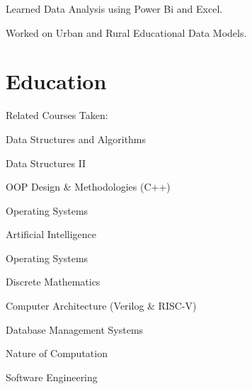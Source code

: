 \documentclass[]{m abbas resume' 2022}
\begin{document}
\begin{minipage}[t]{0.59\textwidth}
\begin{tightemize}
\sectionsep
\item Learned Data Analysis using Power Bi and Excel. 
\item Worked on Urban and Rural Educational Data Models.
\end{tightemize}


\section{Education} 
 
    Related Courses Taken:
    \begin{tightemize}
        \item Data Structures and Algorithms
        \item Data Structures II
        \item OOP Design \& Methodologies (C++)
        \item Operating Systems
        \item Artificial Intelligence
        \item Operating Systems
        \item Discrete Mathematics
        \item Computer Architecture (Verilog \& RISC-V)
        \item Database Management Systems
        \item Nature of Computation
        \item Software Engineering
    \end{tightemize}
    

\end{minipage}
\end{document}
